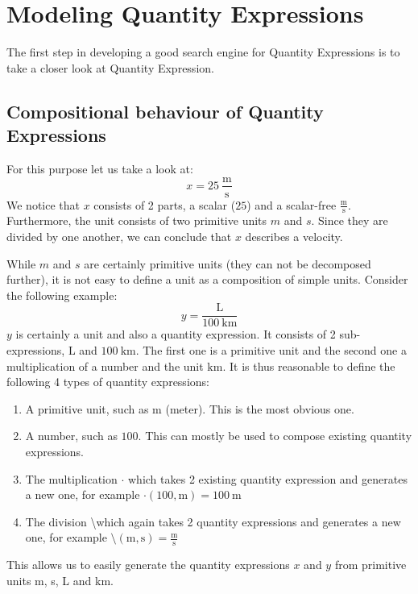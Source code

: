 \section{Modeling Quantity Expressions}

The first step in developing a good search engine for Quantity Expressions is to take a closer look at Quantity Expression.

\subsection{Compositional behaviour of Quantity Expressions}

For this purpose let us take a look at:
\[x = 25\ \frac{\text{m}}{\text{s}}\]
We notice that $x$ consists of 2 parts, a scalar ($25$) and a scalar-free $\frac{\text{m}}{\text{s}}$. Furthermore, the unit consists of two primitive units $m$ and $s$. Since they are divided by one another, we can conclude that $x$ describes a velocity.

While $m$ and $s$ are certainly primitive units (they can not be decomposed further), it is not easy to define a unit as a composition of simple units. Consider the following example:
\[y = \frac{\text{L}}{100\ \text{km}}\]
$y$ is certainly a unit and also a quantity expression. It consists of 2 sub-expressions, $\text{L}$ and $100\ \text{km}$. The first one is a primitive unit and the second one a multiplication of a number and the unit $\text{km}$. It is thus reasonable to define the following 4 types of quantity expressions:
\begin{enumerate}
  \item A primitive unit, such as $\text{m}$ (meter). This is the most obvious one.
  \item A number, such as $100$. This can mostly be used to compose existing quantity expressions.
  \item The multiplication $\cdot{}$ which takes 2 existing quantity expression and generates a new one, for example $\cdot \left(100, \text{m} \right) = 100\ \text{m}$
  \item The division \textbackslash which again takes 2 quantity expressions and generates a new one, for example $\text{\textbackslash} (\text{m}, \text{s}) = \frac{\text{m}}{\text{s}}$
\end{enumerate}
This allows us to easily generate the quantity expressions $x$ and $y$ from primitive units m, s, L and km.

